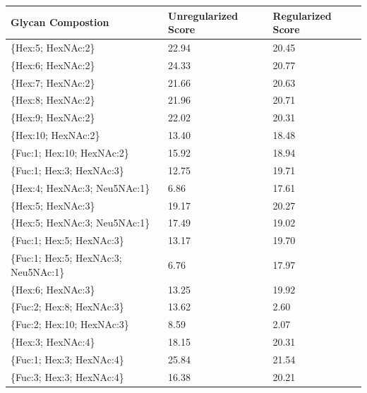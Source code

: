 \begin{table}
\begin{minipage}[t]{0.55\linewidth}
    \begin{small}
    \begin{tabular}{l|p{2cm} p{2cm}}
Glycan Compostion &  Unregularized Score &  Regularized Score \\
\hline
\{Hex:5; HexNAc:2\}                   &                22.94 &              20.45 \\
\{Hex:6; HexNAc:2\}                   &                24.33 &              20.77 \\
\{Hex:7; HexNAc:2\}                   &                21.66 &              20.63 \\
\{Hex:8; HexNAc:2\}                   &                21.96 &              20.71 \\
\{Hex:9; HexNAc:2\}                   &                22.02 &              20.31 \\
\{Hex:10; HexNAc:2\}                  &                13.40 &              18.48 \\
\{Fuc:1; Hex:10; HexNAc:2\}           &                15.92 &              18.94 \\
\{Fuc:1; Hex:3; HexNAc:3\}            &                12.75 &              19.71 \\
\{Hex:4; HexNAc:3; Neu5NAc:1\}        &                 6.86 &              17.61 \\
\{Hex:5; HexNAc:3\}                   &                19.17 &              20.27 \\
\{Hex:5; HexNAc:3; Neu5NAc:1\}        &                17.49 &              19.02 \\
\{Fuc:1; Hex:5; HexNAc:3\}            &                13.17 &              19.70 \\
\{Fuc:1; Hex:5; HexNAc:3; Neu5NAc:1\} &                 6.76 &              17.97 \\
\{Hex:6; HexNAc:3\}                   &                13.25 &              19.92 \\
\{Fuc:2; Hex:8; HexNAc:3\}            &                13.62 &               2.60 \\
\{Fuc:2; Hex:10; HexNAc:3\}           &                 8.59 &               2.07 \\
\{Hex:3; HexNAc:4\}                   &                18.15 &              20.31 \\
\{Fuc:1; Hex:3; HexNAc:4\}            &                25.84 &              21.54 \\
\{Fuc:3; Hex:3; HexNAc:4\}            &                16.38 &              20.21 \\

\end{tabular}
\end{small}
\end{minipage}
\end{table}
